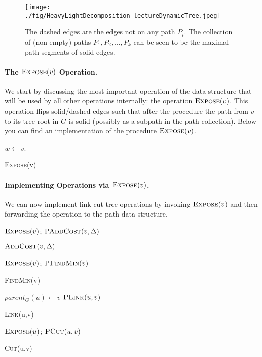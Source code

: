 \begin{figure}[!ht]
    \centering
    \texttt{[image: ./fig/HeavyLightDecomposition\_lectureDynamicTree.jpeg]}
    \caption{The dashed edges are the edges not on any path $P_i$. The collection of (non-empty) paths $P_1, P_2, \dots, P_k$ can be seen to be the maximal path segments of solid edges.}
\end{figure}

\paragraph{The $\textsc{Expose}(v)$ Operation.} We start by discussing the most important operation of the data structure that will be used by all other operations internally: the operation $\textsc{Expose}(v)$. This operation flips solid/dashed edges such that after the procedure the path from $v$ to its tree root in $G$ is solid (possibly as a subpath in the path collection). Below you can find an implementation of the procedure $\textsc{Expose}(v)$. 

\begin{algorithm}
  \SetAlgoLined
  $w \gets v$.\\
  \caption{\textsc{Expose}(v)}
\end{algorithm}

\paragraph{Implementing Operations via $\textsc{Expose}(v)$.} We can now implement link-cut tree operations by invoking $\textsc{Expose}(v)$ and then forwarding the operation to the path data structure. 
\begin{algorithm}[H]
  \SetAlgoLined
  $\textsc{Expose}(v)$; $\textsc{PAddCost}(v, \Delta)$
  \caption{$\textsc{AddCost}(v, \Delta)$}
\end{algorithm}
\begin{algorithm}[H]
  \SetAlgoLined
  $\textsc{Expose}(v)$; \Return $\textsc{PFindMin}(v)$
  \caption{\textsc{FindMin}(v)}
\end{algorithm}
\begin{algorithm}[H]
  \SetAlgoLined
  $parent_G(u) \gets v$\;
  $\textsc{PLink}(u,v)$
  \caption{\textsc{Link}(u,v)}
\end{algorithm}
\begin{algorithm}[H]
  \SetAlgoLined
  $\textsc{Expose}(u)$; $\textsc{PCut}(u,v)$\;
  \caption{\textsc{Cut}(u,v)}
\end{algorithm}

